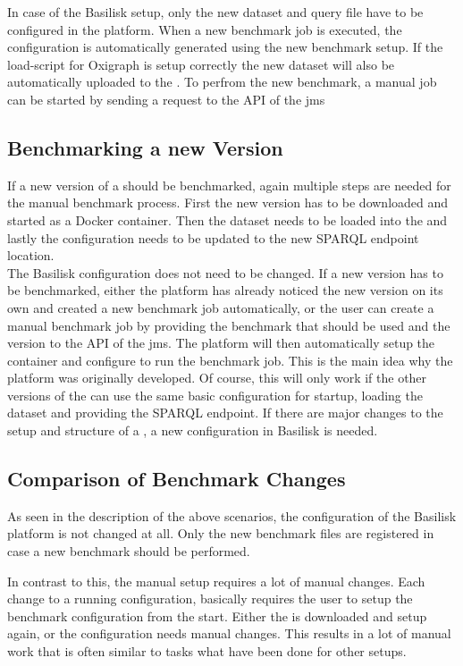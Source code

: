 In case of the Basilisk setup, only the new dataset and query file have to be configured in the platform.
When a new benchmark job is executed, the \iguana{} configuration is automatically generated using the new benchmark setup.
If the load-script for Oxigraph is setup correctly the new dataset will also be automatically uploaded to the \ts{}.
To perfrom the new benchmark, a manual job can be started by sending a request to the API of the \ac{jms}


\subsection{Benchmarking a new Version}
If a new version of a \ts{} should be benchmarked, again multiple steps are needed for the manual benchmark process.
First the new version has to be downloaded and started as a Docker container.
Then the dataset needs to be loaded into the \ts{} and lastly the \iguana{} configuration needs to be updated to the new SPARQL endpoint location.
\\

The Basilisk configuration does not need to be changed.
If a new version has to be benchmarked, either the platform has already noticed the new version on its own and created a new benchmark job automatically, or the user can create a manual benchmark job by providing the benchmark that should be used and the \ts{} version to the API of the \ac{jms}.
The platform will then automatically setup the container and configure \iguana{} to run the benchmark job.
This is the main idea why the platform was originally developed.
Of course, this will only work if the other versions of the \ts{} can use the same basic configuration for startup, loading the dataset and providing the SPARQL endpoint.
If there are major changes to the setup and structure of a \ts{}, a new configuration in Basilisk is needed.


\subsection{Comparison of Benchmark Changes}
As seen in the description of the above scenarios, the \ts{} configuration of the Basilisk platform is not changed at all.
Only the new benchmark files are registered in case a new benchmark should be performed.

In contrast to this, the manual setup requires a lot of manual changes.
Each change to a running configuration, basically requires the user to setup the benchmark configuration from the start.
Either the \ts{} is downloaded and setup again, or the \iguana{} configuration needs manual changes.
This results in a lot of manual work that is often similar to tasks what have been done for other setups.


